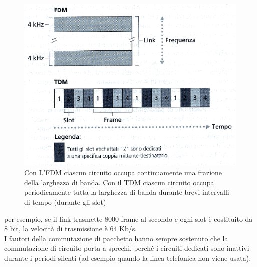 \documentclass[11pt,a4paper]{article}
\begin{document}
\begin{figure}
	\begin{center}
		\includegraphics[scale=0.7]{img/003.png}
		\caption{Con L'FDM ciascun circuito occupa continuamente una frazione della larghezza di banda. Con il TDM ciascun circuito occupa periodicamente tutta la larghezza di banda durante brevi intervalli di tempo (durante gli slot)}
	\end{center}
\end{figure}

per esempio, se il link trasmette 8000 frame al secondo e ogni slot è costituito da 8 bit, la velocità di trasmissione è 64 Kb/s. \\
I fautori della commutazione di pacchetto hanno sempre sostenuto che la commutazione di circuito porta a sprechi, perché i circuiti dedicati sono 	inattivi durante i periodi silenti (ad esempio quando la linea telefonica non viene usata).
\end{document}
